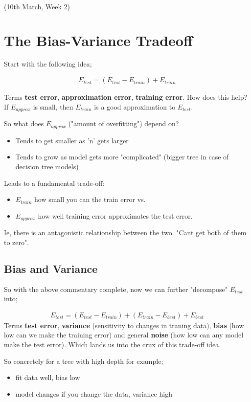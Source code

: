 \documentclass{article}
\begin{document}
(10th March, Week 2)
\section*{The Bias-Variance Tradeoff}
Start with the following idea;

\begin{align*}
	E_{test}=(E_{test} - E_{train}) + E_{train}
\end{align*}

Terms {\bf test error}, {\bf approximation error}, {\bf training error}. How does this help? If $E_{approx}$ is small, then $E_{train}$ is a good approximation to $E_{test}$.

So what does $E_{approx}$ ("amount of overfitting") depend on?
\begin{itemize}
	\item Tends to get smaller as 'n' gets larger
	\item Tends to grow as model gets more "complicated" (bigger tree in case of decision tree models)
\end{itemize}

Leads to a fundamental trade-off:
\begin{itemize}
	\item $E_{train}$ how small you can the train error vs.
	\item $E_{approx}$ how well training error approximates the test error.
\end{itemize}

Ie, there is an antagonistic relationship between the two. "Cant get both of them to zero".

\subsection*{Bias and Variance}
So with the above commentary complete, now we can further "decompose" $E_{test}$ into;

\begin{align*}
	E_{test}=(E_{test} - E_{train}) + (E_{train} - E_{best}) + E_{best}
\end{align*}
Terms {\bf test error}, {\bf variance} (sensitivity to changes in traning data), {\bf bias} (how low can we make the training error) and general {\bf noise} (how low can any model make the test error). Which lands us into the crux of this trade-off idea.

So concretely for a tree with high depth for example;
\begin{itemize}
	\item fit data well, bias low
	\item model changes if you change the data, variance high
\end{itemize}
\end{document}
